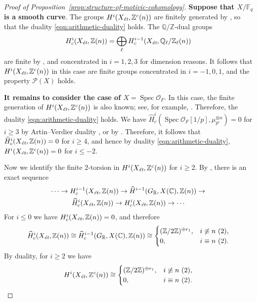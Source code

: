 \documentclass[draft]{article}
\DeclareMathOperator{\Spec}{Spec}
\newcommand{\CC}{\mathbb{C}}
\newcommand{\FF}{\mathbb{F}}
\newcommand{\QQ}{\mathbb{Q}}
\newcommand{\RR}{\mathbb{R}}
\newcommand{\ZZ}{\mathbb{Z}}
\newcommand{\et}{\text{\it \'{e}t}}
\theoremstyle{myplain}
\theoremstyle{mydefinition}
\begin{document}
\begin{proof}[Proof of Proposition~\ref{prop:structure-of-motivic-cohomology}]
  \vspace{1em}

  \textbf{Suppose that $X/\FF_q$ is a smooth curve}. The groups
  $H^i (X_\et, \ZZ^c (n))$ are finitely generated by
  \cite[Proposition~4.3]{Geisser-2017}, so that the duality
  \eqref{eqn:arithmetic-duality} holds. The $\QQ/\ZZ$-dual groups
  \[ H^i_c (X_\et, \ZZ(n)) =
    \bigoplus_\ell H^{i-1}_c (X_\et, \QQ_\ell/\ZZ_\ell (n)) \]
  are finite by \cite[Theorem~3]{Kahn-2003}, and concentrated in $i = 1,2,3$ for
  dimension reasons. It follows that $H^i (X_\et, \ZZ^c (n))$ in this case are
  finite groups concentrated in $i = -1,0,1$, and the property $\mathcal{P} (X)$
  holds.

  \vspace{1em}

  \textbf{It remains to consider the case of $X = \Spec \mathcal{O}_F$}.
  In this case, the finite generation of $H^i (X_\et, \ZZ^c (n))$ is also known;
  see, for example, \cite[Proposition~4.14]{Geisser-2017}. Therefore, the
  duality \eqref{eqn:arithmetic-duality} holds. We have
  $\widehat{H}^i_c (\Spec \mathcal{O}_F [1/p], \mu_{p^r}^{\otimes n}) = 0$ for
  $i \ge 3$ by Artin--Verdier duality \cite[Chapter~II,
  Corollary~3.3]{Milne-ADT}, or by \cite[p.\,268]{Soule-1979}. Therefore, it
  follows that $\widehat{H}^i_c (X_\et, \ZZ (n)) = 0$ for $i \ge 4$, and hence
  by duality \eqref{eqn:arithmetic-duality}, $H^i (X_\et, \ZZ^c (n)) = 0$ for
  $i \le -2$.

  Now we identify the finite $2$-torsion in $H^i (X_\et, \ZZ^c (n))$ for
  $i \ge 2$. By \cite[Lemma~6.14]{Flach-Morin-2018}, there is an exact
  sequence
  \begin{multline}
    \label{eqn:les-Hc-vs-H-hat-c}
    \cdots \to H^{i-1}_c (X_\et, \ZZ (n)) \to
    \widehat{H}^{i-1} (G_\RR, X(\CC), \ZZ (n)) \to \\
    \widehat{H}^i_c (X_\et, \ZZ (n)) \to
    H^i_c (X_\et, \ZZ (n)) \to \cdots
  \end{multline}
  For $i \le 0$ we have $H^i_c (X_\et, \ZZ (n)) = 0$, and therefore
  \[ \widehat{H}^i_c (X_\et, \ZZ (n)) \cong
    \widehat{H}^{i-1}_c (G_\RR, X(\CC), \ZZ (n)) \cong
    \begin{cases}
      (\ZZ/2\ZZ)^{\oplus r_1}, & i\not\equiv n ~ (2), \\
      0, & i\equiv n ~ (2).
    \end{cases} \]
  By duality, for $i \ge 2$ we have
  \[ H^i (X_\et, \ZZ^c (n)) \cong
    \begin{cases}
      (\ZZ/2\ZZ)^{\oplus r_1}, & i\not\equiv n ~ (2), \\
      0, & i\equiv n ~ (2).
    \end{cases} \]


\end{proof}
\end{document}
